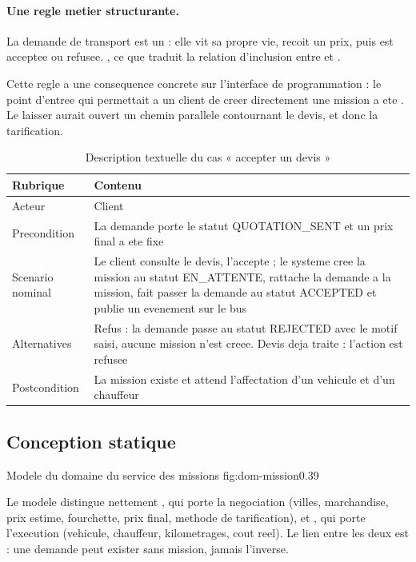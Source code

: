 \paragraph{Une regle metier structurante.}
 La
demande de transport est un  : elle vit sa propre vie,
recoit un prix, puis est acceptee ou refusee. , ce que traduit la relation d'inclusion entre
 et .

Cette regle a une consequence concrete sur l'interface de programmation :
le point d'entree qui permettait a un client de creer directement une
mission a ete . Le laisser aurait ouvert un chemin
parallele contournant le devis, et donc la tarification.

\begin{table}[H]
\centering
\caption{Description textuelle du cas « accepter un devis »}
\label{tab:desc-devis}
\small
\begin{tabularx}{\textwidth}{@{}p{2.5cm}X@{}}
\toprule
\textbf{Rubrique} & \textbf{Contenu} \\ \midrule
Acteur & Client \\
Precondition & La demande porte le statut QUOTATION\_SENT et un prix
  final a ete fixe \\
Scenario nominal & Le client consulte le devis, l'accepte ; le systeme
  cree la mission au statut EN\_ATTENTE, rattache la demande a la mission,
  fait passer la demande au statut ACCEPTED et publie un evenement sur
  le bus \\
Alternatives & Refus : la demande passe au statut REJECTED avec le motif
  saisi, aucune mission n'est creee. Devis deja traite : l'action est
  refusee \\
Postcondition & La mission existe et attend l'affectation d'un vehicule
  et d'un chauffeur \\
\bottomrule
\end{tabularx}
\end{table}

\subsection{Conception statique}

  {Modele du domaine du service des missions}
  {fig:dom-mission}{0.39}

Le modele distingue nettement , qui porte la
negociation (villes, marchandise, prix estime, fourchette, prix final,
methode de tarification), et , qui porte l'execution
(vehicule, chauffeur, kilometrages, cout reel). Le lien entre les deux
est  : une demande peut exister sans
mission, jamais l'inverse.

